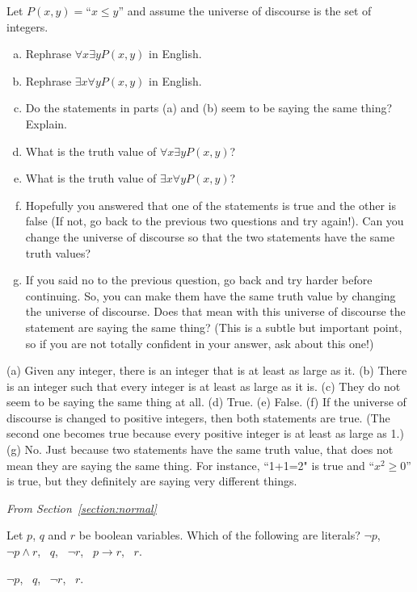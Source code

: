 \begin{requ}
Let $P(x,y)=$``$x\leq y$'' and assume the universe of discourse is the set of integers.
\begin{enumerate}[(a)]
\item
Rephrase $\forall x\exists y P(x,y)$ in English.
\item
Rephrase $\exists x\forall y P(x,y)$ in English.
\item 
Do the statements in parts (a) and (b) seem to be saying the same thing? Explain.
\item
What is the truth value of $\forall x\exists y P(x,y)$?
\item
What is the truth value of $\exists x\forall y P(x,y)$?
\item
Hopefully you answered that one of the statements is true and the other is false
(If not, go back to the previous two questions and try again!).
Can you change the universe of discourse so that the two statements have the same truth values?
\item 
If you said no to the previous question, go back and try harder before continuing.
So, you can make them have the same truth value by changing the universe of discourse.  
Does that mean with this universe of discourse the statement are saying the same thing? 
(This is a subtle but important point, so if you are not totally confident in your answer, ask about this one!)
\end{enumerate}
\begin{requanswer}
(a) Given any integer, there is an integer that is at least as large as it.
(b) There is an integer such that every integer is at least as large as it is.
(c) They do not seem to be saying the same thing at all.
(d) True.
(e) False.
(f) If the universe of discourse is changed to positive integers, then both statements are true.
(The second one becomes true because every positive integer is at least as large as 1.)
(g) No. Just because two statements have the same truth value, that does not mean they are saying the same thing.
For instance, ``1+1=2" is true and ``$x^2\geq 0$'' is true, but they definitely are saying very different things. 
\end{requanswer}
\end{requ}

\medskip

\noindent
{\em From Section~\ref{section:normal}}

\begin{requ}
Let $p$, $q$ and $r$ be boolean variables. Which of the following are literals? 
$\neg p$, \, $\neg p \wedge r$, \, $q$, \, $\neg r$, \, $p\rightarrow r$, \, $r$.
\begin{requanswer}
$\neg p$, \, $q$, \, $\neg r$, \, $r$.
\end{requanswer}
\end{requ}

